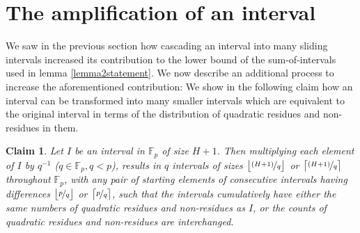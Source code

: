 \documentclass{report}
\newtheorem*{claim*}{Claim}
\begin{document}
\section{The amplification of an interval}
We saw in the previous section how cascading an interval into many sliding intervals increased its contribution to the lower bound  of the sum-of-intervals used in lemma \ref{lemma2statement}. We now describe an additional process to increase the aforementioned contribution: We show in the following claim how an interval can be transformed into many smaller intervals which are equivalent to the original interval in terms of the distribution of quadratic residues and non-residues in them.

\begin{claim*}
Let $I$ be an interval in $\mathbb{F}_p$ of size $H+1$. Then multiplying each element of $I$ by $q^{-1}$ ($q\in\mathbb{F}_p,q<p$), results in $q$ intervals of sizes $\big \lfloor \nicefrac{(H+1)}{q}\big\rfloor$ or $\big \lceil \nicefrac{(H+1)}{q}\big\rceil$ throughout $\mathbb{F}_p$, with any pair of starting elements of consecutive intervals having differences $\big \lfloor\nicefrac{p}{q}\big\rfloor$ or $\big \lceil\nicefrac{p}{q}\big\rceil$, such that the intervals cumulatively have either the same numbers of quadratic residues and non-residues as $I$, or the counts of quadratic residues and non-residues are interchanged.
\end{claim*}
\end{document}
